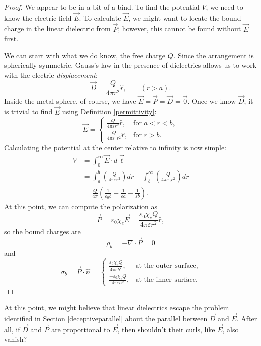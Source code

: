\begin{proof}
We appear to be in a bit of a bind. To find the potential $V$, we need to know the electric field $\vec{E}$. To calculate $\vec{E}$, we might want to locate the bound charge in the linear dielectric from $\vec{P}$; however, this cannot be found without $\vec{E}$ first.

We can start with what we do know, the free charge $Q$. Since the arrangement is spherically symmetric, Gauss's law in the presence of dielectrics allows us to work with the electric \textit{displacement}:
\[\vec{D}=\frac{Q}{4\pi r^2}\hat{r}, \qquad (r>a).\]
Inside the metal sphere, of course, we have $\vec{E}=\vec{P}=\vec{D}=\vec{0}$. Once we know $\vec{D}$, it is trivial to find $\vec{E}$ using Definition \ref{permittivity}:
\[\vec{E}=\begin{cases}
\frac{Q}{4\pi\varepsilon r^2}\hat{r}, & \text{for }a<r<b,\\
\frac{Q}{4\pi\varepsilon_0 r^2}\hat{r}, & \text{for }r>b.
\end{cases}\]
Calculating the potential at the center relative to infinity is now simple:
\begin{align*}
   V&=\int_0^\infty\vec{E}\cdot d\vec{\ell}\\
   &=\int_a^b\left(\frac{Q}{4\pi \varepsilon r^2}\right)dr+\int_b^\infty\left(\frac{Q}{4\pi\varepsilon_0r^2}\right)dr\\
   &=\boxed{\frac{Q}{4\pi}\left(\frac{1}{\varepsilon_0b}+\frac{1}{\varepsilon a}-\frac{1}{\varepsilon b}\right)}.
\end{align*}
At this point, we can compute the polarization as
\[\vec{P}=\varepsilon_0\chi_e\vec{E}=\frac{\varepsilon_0\chi_eQ}{4\pi\varepsilon r^2}\hat{r},\]
so the bound charges are
\[\rho_b=-\nabla\cdot \vec{P}=0\]
and
\[\sigma_b=\vec{P}\cdot\hat{n}=\begin{cases}
\frac{\varepsilon_0\chi_eQ}{4\pi \varepsilon b^2}, & \text{at the outer surface},\\
\frac{-\varepsilon_0\chi_eQ}{4\pi \varepsilon a^2}, & \text{at the inner surface}.
\end{cases}\]
\end{proof}

At this point, we might believe that linear dielectrics escape the problem identified in Section \ref{deceptiveparallel} about the parallel between $\vec{D}$ and $\vec{E}$. After all, if $\vec{D}$ and $\vec{P}$ are proportional to $\vec{E}$, then shouldn't their curls, like $\vec{E}$, also vanish?

